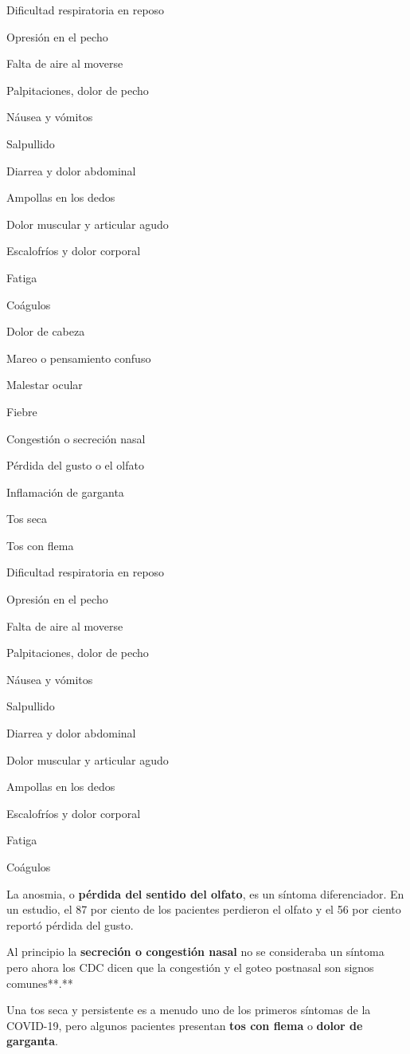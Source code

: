 Dificultad respiratoria en reposo

Opresión en el pecho

Falta de aire al moverse

Palpitaciones, dolor de pecho

Náusea y vómitos

Salpullido

Diarrea y dolor abdominal

Ampollas en los dedos

Dolor muscular y articular agudo

Escalofríos y dolor corporal

Fatiga

Coágulos

Dolor de cabeza

Mareo o pensamiento confuso

Malestar ocular

Fiebre

Congestión o secreción nasal

Pérdida del gusto o el olfato

Inflamación de garganta

Tos seca

Tos con flema

Dificultad respiratoria en reposo

Opresión en el pecho

Falta de aire al moverse

Palpitaciones, dolor de pecho

Náusea y vómitos

Salpullido

Diarrea y dolor abdominal

Dolor muscular y articular agudo

Ampollas en los dedos

Escalofríos y dolor corporal

Fatiga

Coágulos

La anosmia, o \textbf{pérdida del sentido del olfato}, es un síntoma
diferenciador. En un estudio, el 87 por ciento de los pacientes
perdieron el olfato y el 56 por ciento reportó pérdida del gusto.

Al principio la \textbf{secreción o congestión nasal} no se consideraba
un síntoma pero ahora los CDC dicen que la congestión y el goteo
postnasal son signos comunes**.**

Una tos seca y persistente es a menudo uno de los primeros síntomas de
la COVID-19, pero algunos pacientes presentan \textbf{tos con flema} o
\textbf{dolor de garganta}.

